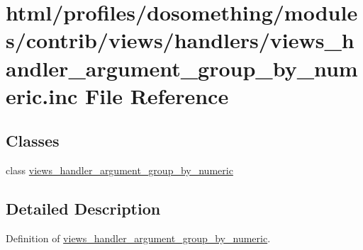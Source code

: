 \hypertarget{views__handler__argument__group__by__numeric_8inc}{
\section{html/profiles/dosomething/modules/contrib/views/handlers/views\_\-handler\_\-argument\_\-group\_\-by\_\-numeric.inc File Reference}
\label{views__handler__argument__group__by__numeric_8inc}
}
\subsection*{Classes}
\begin{DoxyCompactItemize}
\item 
class \hyperlink{classviews__handler__argument__group__by__numeric}{views\_\-handler\_\-argument\_\-group\_\-by\_\-numeric}
\end{DoxyCompactItemize}


\subsection{Detailed Description}
Definition of \hyperlink{classviews__handler__argument__group__by__numeric}{views\_\-handler\_\-argument\_\-group\_\-by\_\-numeric}. 